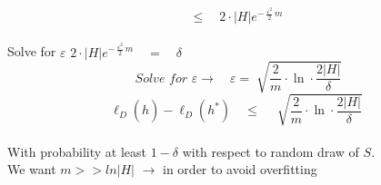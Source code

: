 \documentclass[../main.tex]{subfiles}
\begin{document}
$$
\leq \quad 2 \cdot |H| e^{- \, \frac{\varepsilon^2}{2} \, m}
$$
\\ 
Solve for $\varepsilon$ \qquad
$
2 \cdot |H| e^{- \, \frac{\varepsilon^2}{2} \, m} \quad = \quad \delta
$
$$
\textit{ Solve for } \varepsilon \longrightarrow \quad  \varepsilon = \sqrt[]{\frac{2}{m} \cdot \ln \cdot \frac{2|H|}{\delta}}
$$
$$
\ell_D\left(\hat{h}\right) - \ell_D \left( h^* \right) \quad\leq \quad \sqrt[]{\frac{2}{m} \cdot \ln \cdot \frac{2|H|}{\delta}}
$$
\\
With probability at least $1 - \delta$ with respect to random draw of $S$.\\
We want $m >> ln |H|$ \quad $\longrightarrow$ in order to avoid overfitting
\\
\end{document}
